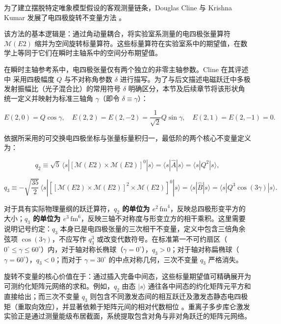 为了建立摆脱特定唯象模型假设的客观测量链条，Douglas Cline 与 Krishna Kumar 发展了电四极旋转不变量方法 \cite{cline-1986-nuclear-shapes-coulomb-excitation}。

该方法的基本逻辑是：通过角动量耦合，将实验室系测量的电四极张量算符 $\mathcal{M}(E2)$ 缩并为空间旋转标量算符。这些标量算符在实验室系中的期望值，在数学上等同于它们在瞬时主轴系中的空间分布期望值。

在瞬时主轴参考系中，电四极张量仅有两个独立的非零主轴参数。Cline 在其评述中 \cite{cline-1986-nuclear-shapes-coulomb-excitation} 采用四极幅度 $Q$ 与不对称角参数 $\delta$ 进行描写。为了与后文描述电磁跃迁中多极发射振幅比（光子混合比）的常用符号 $\delta$ 明确区分，本节及后续章节将该形状角统一定义并映射为标准三轴角 $\gamma$（即令 $\delta \equiv \gamma$）：

\begin{equation}\label{eq:1-2-13}
E(2, 0) = Q \cos\gamma, \quad E(2, 2) = E(2, -2) = \frac{1}{\sqrt{2}} Q \sin\gamma, \quad E(2, 1) = E(2, -1) = 0.
\end{equation}

依据所采用的可交换电四极坐标与张量标量积归一，最低阶的两个核心不变量定义为：

\begin{equation}\label{eq:1-2-14}
q_2 \equiv \sqrt{5} \, \langle s | [\mathcal{M}(E2) \times \mathcal{M}(E2)]^0 | s \rangle = \langle s | \hat{A} | s \rangle = \langle s | Q^2 | s \rangle,
\end{equation}

\begin{equation}\label{eq:1-2-15}
q_3 \equiv -\sqrt{\frac{35}{2}} \, \langle s | [[\mathcal{M}(E2) \times \mathcal{M}(E2)]^2 \times \mathcal{M}(E2)]^0 | s \rangle = \langle s | \hat{B} | s \rangle = \langle s | Q^3 \cos(3\gamma) | s \rangle.
\end{equation}

对于具有实际物理量纲的跃迁算符，\textbf{$q_2$ 的单位为 $e^2\,\mathrm{fm}^4$}，反映总四极形变平方的大小；\textbf{$q_3$ 的单位为 $e^3\,\mathrm{fm}^6$}，反映三轴不对称度与形变立方的相干乘积。这里需要说明记号约定：$q_3$ 本身已是电四极张量的三次相干不变量，定义中包含三倍角余弦项 $\cos(3\gamma)$，不应写作 $q_3^3$ 或改变代数符号。在标准第一不可约扇区（$0^\circ \le \gamma \le 60^\circ$）内，对于轴对称长椭球（$\gamma = 0^\circ$），$q_3 > 0$；对于轴对称扁椭球（$\gamma = 60^\circ$），$q_3 < 0$；而对于 $\gamma = 30^\circ$ 的中点对称几何，三次不变量 $q_3$ 严格消失。

旋转不变量的核心价值在于：通过插入完备中间态，这些标量期望值可精确展开为可测约化矩阵元网络的求和。例如，$q_2$ 由态 $|s\rangle$ 通往各中间态的约化矩阵元平方和直接给出；而三次不变量 $q_3$ 则包含不同激发态间的相互跃迁及激发态静态电四极矩（重取向效应），并显著依赖于矩阵元间的相对代数相位 \cite{cline-1986-nuclear-shapes-coulomb-excitation}。重离子多步库仑激发实验正是通过测量能级布居截面，系统提取包含对角与非对角跃迁的矩阵元网络。

